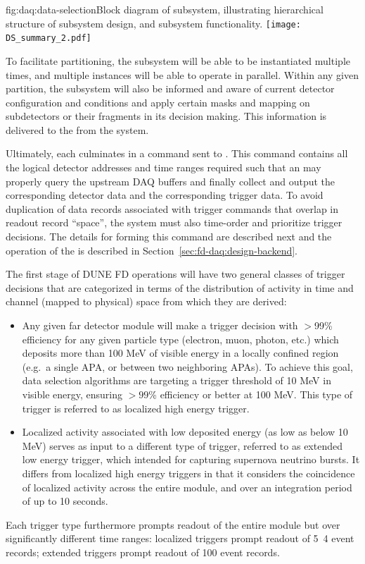 \begin{dunefigure}{fig:daq:data-selection}{Block diagram of  
     subsystem, illustrating hierarchical structure of
    subsystem design, and subsystem functionality.}
  \texttt{[image: DS\_summary\_2.pdf]}
\end{dunefigure}

To facilitate partitioning, the  subsystem will be
able to be instantiated multiple times, and multiple instances will be
able to operate in parallel. Within any
given partition, the  subsystem will also be
informed and aware of current detector configuration and conditions and
apply certain masks and mapping on subdetectors or their fragments in
its decision making. This information is delivered to the
 from the  system.

Ultimately, each  culminates in a command sent to . 
This command contains all the logical detector addresses and time ranges
required such that an  may properly query the upstream DAQ
buffers and finally collect and output the corresponding detector data
and the corresponding trigger data. To avoid duplication of data
records associated with trigger commands that overlap in readout
record ``space'', the  system must also time-order and
prioritize trigger decisions. The details for forming this
command are described next and the operation of the  is
described in Section~\ref{sec:fd-daq:design-backend}.

The first stage of DUNE FD operations will have two general classes of trigger
decisions that are categorized in terms of the distribution of activity
in time and channel (mapped to physical) space from which they are derived: 
\begin{itemize}
\item Any given far detector module will make a 
  trigger decision with $>$99\% efficiency for any given particle
  type (electron, muon, photon, etc.) 
  which deposits more than 100 MeV of visible energy in a locally
  confined region (e.g.~a single APA, or between two neighboring APAs). To achieve this
  goal, data selection algorithms are targeting a trigger threshold of
  10 MeV in visible energy, ensuring $>99$\% efficiency or better
  at 100 MeV. 
  This type of trigger is referred to as localized high
  energy trigger.
\item    Localized activity associated with low deposited energy (as
  low as below 10 MeV) serves as input to a different type of trigger,
  referred to as extended low energy trigger, which intended for
  capturing supernova neutrino bursts. It differs from localized high
  energy triggers in that it considers the coincidence of localized
  activity across the entire module, and over an integration period of up to 10
  seconds.
\end{itemize}
Each trigger type furthermore prompts readout
    of the entire module but over significantly different time
    ranges: localized triggers prompt readout of \si{5.4}{\milli\second} event records; extended
    triggers prompt readout of \si{100}{\second} event records. 

